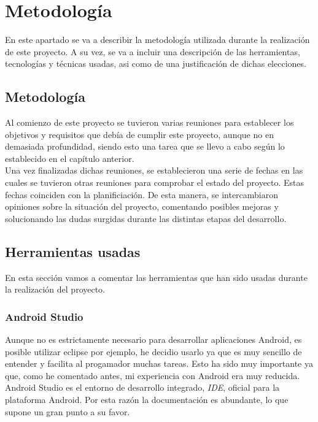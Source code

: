 \chapter{Metodología}
\label{cap:metodologia}

En este apartado se va a describir la metodología utilizada durante la realización de este proyecto. A su vez, se va a incluir una descripción de las herramientas, tecnologías y técnicas usadas, asi como de una justificación de dichas elecciones.


\section{Metodología}

Al comienzo de este proyecto se tuvieron varias reuniones para establecer los objetivos y requisitos que debía de cumplir este proyecto, aunque no en demasiada profundidad, siendo esto una tarea que se llevo a cabo según lo establecido en el capítulo anterior.\\

Una vez finalizadas dichas reuniones, se establecieron una serie de fechas en las cuales se tuvieron otras reuniones para comprobar el estado del proyecto. Estas fechas coinciden con la planificiación. De esta manera, se intercambiaron opiniones sobre la situación del proyecto, comentando posibles mejoras y solucionando las dudas surgidas durante las distintas etapas del desarrollo.\\

\section{Herramientas usadas}

En esta sección vamos a comentar las herramientas que han sido usadas durante la realización del proyecto.

\subsection{Android Studio}

Aunque no es estrictamente necesario para desarrollar aplicaciones Android, es posible utilizar eclipse por ejemplo, he decidio usarlo ya que es muy sencillo de entender y facilita al progamador muchas tareas. Esto ha sido muy importante ya que, como he comentado antes, mi experiencia con Android era muy reducida.\\

Android Studio es el entorno de desarrollo integrado, \textit{IDE}, oficial para la plataforma Android. Por esta razón la documentación es abundante, lo que supone un gran punto a su favor.\\

